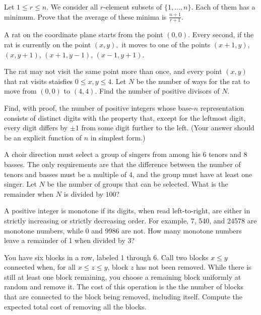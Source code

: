 \documentclass[mast]{lucky}
\begin{document}
\vspace{0.2cm}

\begin{prob}[IMO 1981/2]{6}
Let $1\leq r\leq n.$ We consider all $r$-element subsets of $\{1,\ldots,n\}.$ Each of them has a minimum. Prove that the average of these minima is $\frac{n+1}{r+1}.$
\end{prob}

\begin{prob}[CIME II 2021/6]{6}
A rat on the coordinate plane starts from the point $(0,0).$ Every second, if the rat is currently on the point $(x,y),$ it moves to one of the points $(x+1,y)$, $(x,y+1)$, $(x+1,y-1)$, $(x-1,y+1).$

\noindent The rat may not visit the same point more than once, and every point $(x,y)$ that rat visits staisfies $0\leq x, y\leq 4.$ Let $N$ be the number of ways for the rat to move from $(0,0)$ to $(4,4).$ Find the number of positive divisors of $N.$
\end{prob}

\begin{prob}[USAMO 1990/4]{9}
Find, with proof, the number of positive integers whose base-$n$ representation consists of distinct digits with the property that, except for the leftmost digit, every digit differs by $\pm 1$ from some digit further to the left. (Your answer should be an explicit function of $n$ in simplest form.)
\end{prob}

\begin{req}[AMC 12A 2021/15]{9}
A choir direction must select a group of singers from among his $6$ tenors and $8$ basses. The only requirements are that the difference between the number of tenors and basses must be a multiple of $4$, and the group must have at least one singer. Let $N$ be the number of groups that can be selected. What is the remainder when $N$ is divided by $100$?
\end{req}

    
    \begin{prob}{13}
A positive integer is monotone if its digits, when read left-to-right, are either in strictly increasing or strictly decreasing order. For example, 7, 540, and 24578 are monotone numbers, while 0 and 9986 are not. How many monotone numbers leave a remainder of 1 when divided by 3?
\end{prob}
    
    \begin{prob}{13}
You have six blocks in a row, labeled 1 through 6. Call two blocks $x \le y$
    connected when, for all $x \le z \le y$, block $z$ has not been removed. While there is still at least one block remaining, you choose a remaining block uniformly at random and remove it. The cost of this operation is the the number of blocks that are connected to the block being removed, including itself. Compute the expected total cost of removing all the blocks.
\end{prob}
\end{document}
